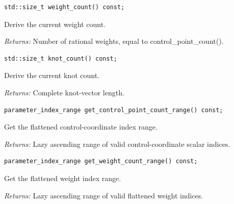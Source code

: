 \par\noindent\begin{minipage}{\linewidth}
\begin{lstlisting}[style=apireference]
std::size_t weight_count() const;
\end{lstlisting}
{\footnotesize Derive the current weight count.\par}
{\footnotesize\textit{Returns:} Number of rational weights, equal to control\_point\_count().\par}
\end{minipage}\par\vspace{1pt}
\par\noindent\begin{minipage}{\linewidth}
\begin{lstlisting}[style=apireference]
std::size_t knot_count() const;
\end{lstlisting}
{\footnotesize Derive the current knot count.\par}
{\footnotesize\textit{Returns:} Complete knot-vector length.\par}
\end{minipage}\par\vspace{1pt}
\par\noindent\begin{minipage}{\linewidth}
\begin{lstlisting}[style=apireference]
parameter_index_range get_control_point_count_range() const;
\end{lstlisting}
{\footnotesize Get the flattened control-coordinate index range.\par}
{\footnotesize\textit{Returns:} Lazy ascending range of valid control-coordinate scalar indices.\par}
\end{minipage}\par\vspace{1pt}
\par\noindent\begin{minipage}{\linewidth}
\begin{lstlisting}[style=apireference]
parameter_index_range get_weight_count_range() const;
\end{lstlisting}
{\footnotesize Get the flattened weight index range.\par}
{\footnotesize\textit{Returns:} Lazy ascending range of valid flattened weight indices.\par}
\end{minipage}\par\vspace{1pt}
